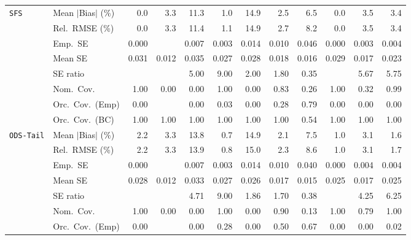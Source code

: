 \begin{landscape}
\begin{longtable}{llrrrrrrrrrr}
\addlinespace[2pt]
\quad \texttt{SFS} & Mean $|$Bias$|$ (\%) & \cellcolor{rankone}0.0 & 3.3 & 11.3 & \cellcolor{rankthree}1.0 & 14.9 & 2.5 & 6.5 & \cellcolor{ranktwo}0.0 & 3.5 & 3.4 \\
 & Rel.\ RMSE (\%) & \cellcolor{rankone}0.0 & 3.3 & 11.4 & \cellcolor{rankthree}1.1 & 14.9 & 2.7 & 8.2 & \cellcolor{ranktwo}0.0 & 3.5 & 3.4 \\
 & Emp.\ SE & 0.000 &  & 0.007 & 0.003 & 0.014 & 0.010 & 0.046 & 0.000 & 0.003 & 0.004 \\
 & Mean SE & 0.031 & 0.012 & 0.035 & 0.027 & 0.028 & 0.018 & 0.016 & 0.029 & 0.017 & 0.023 \\
 & SE ratio &  &  & 5.00 & 9.00 & \cellcolor{rankthree}2.00 & \cellcolor{ranktwo}1.80 & \cellcolor{rankone}0.35 &  & 5.67 & 5.75 \\
 & Nom.\ Cov. & \cellcolor{ranktwo}1.00 & 0.00 & 0.00 & \cellcolor{rankthree}1.00 & 0.00 & 0.83 & 0.26 & 1.00 & 0.32 & \cellcolor{rankone}0.99 \\
 & Orc.\ Cov.\ (Emp) & 0.00 &  & 0.00 & \cellcolor{rankthree}0.03 & 0.00 & \cellcolor{ranktwo}0.28 & \cellcolor{rankone}0.79 & 0.00 & 0.00 & 0.00 \\
 & Orc.\ Cov.\ (BC) & \cellcolor{ranktwo}1.00 & \cellcolor{rankthree}1.00 & 1.00 & 1.00 & \cellcolor{rankone}1.00 & 1.00 & 0.54 & 1.00 & 1.00 & 1.00 \\
\addlinespace[2pt]
\quad \texttt{ODS-Tail} & Mean $|$Bias$|$ (\%) & 2.2 & 3.3 & 13.8 & \cellcolor{rankone}0.7 & 14.9 & 2.1 & 7.5 & \cellcolor{ranktwo}1.0 & 3.1 & \cellcolor{rankthree}1.6 \\
 & Rel.\ RMSE (\%) & 2.2 & 3.3 & 13.9 & \cellcolor{rankone}0.8 & 15.0 & 2.3 & 8.6 & \cellcolor{ranktwo}1.0 & 3.1 & \cellcolor{rankthree}1.7 \\
 & Emp.\ SE & 0.000 &  & 0.007 & 0.003 & 0.014 & 0.010 & 0.040 & 0.000 & 0.004 & 0.004 \\
 & Mean SE & 0.028 & 0.012 & 0.033 & 0.027 & 0.026 & 0.017 & 0.015 & 0.025 & 0.017 & 0.025 \\
 & SE ratio &  &  & 4.71 & 9.00 & \cellcolor{rankthree}1.86 & \cellcolor{ranktwo}1.70 & \cellcolor{rankone}0.38 &  & 4.25 & 6.25 \\
 & Nom.\ Cov. & \cellcolor{ranktwo}1.00 & 0.00 & 0.00 & \cellcolor{rankthree}1.00 & 0.00 & \cellcolor{rankone}0.90 & 0.13 & 1.00 & 0.79 & 1.00 \\
 & Orc.\ Cov.\ (Emp) & 0.00 &  & 0.00 & \cellcolor{rankthree}0.28 & 0.00 & \cellcolor{ranktwo}0.50 & \cellcolor{rankone}0.67 & 0.00 & 0.00 & 0.02 \\

\end{longtable}
\end{landscape}
